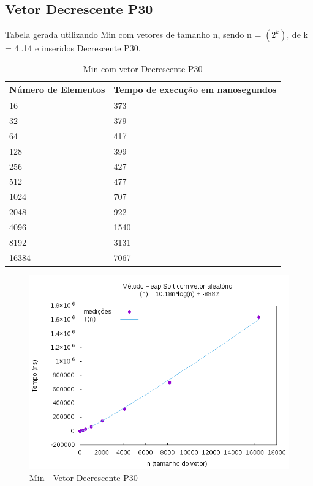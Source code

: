 \documentclass[12pt,a4paper,twoside]{report}
\begin{document}
\subsection{Vetor Decrescente P30}
Tabela gerada utilizando Min com vetores de tamanho n, sendo n = $(2^k)$, de k = 4..14 e inseridos Decrescente P30.
\begin{table}[H]
\centering
\caption{Min com vetor Decrescente P30}
\label{my-label}
\begin{tabular}{|l|l|}
\hline
\multicolumn{1}{|c|}{\textbf{Número de Elementos}} & \multicolumn{1}{c|}{\textbf{Tempo de execução em nanosegundos}} \\ \hline
16 & 373 \\ \hline
32 & 379 \\ \hline
64 & 417 \\ \hline
128 & 399 \\ \hline
256 & 427 \\ \hline
512 & 477 \\ \hline
1024 & 707 \\ \hline
2048 & 922 \\ \hline
4096 & 1540 \\ \hline
8192 & 3131 \\ \hline
16384 & 7067 \\ \hline
\end{tabular}
\end{table}

\begin{figure}[H]
    \centering
    \includegraphics[width=0.7\linewidth]{graficos/HeapSort/vIntAleatorio/vIntAleatorio.png}
  \caption{Min - Vetor Decrescente P30}
\end{figure}
\end{document}
